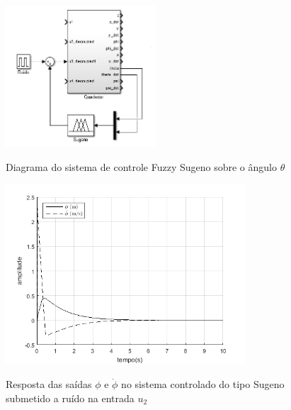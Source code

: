 \begin{figure}[!htb]
    \centering
    \caption{Diagrama do sistema de controle Fuzzy Sugeno sobre o ângulo $\theta$}
    \includegraphics[width=0.5\textwidth]{./04-figuras/resultados/fis_u3/u3_sugeno_blocks}
    \label{fig:u3_sugeno_blocks}
\end{figure}


\begin{figure}[!htb]
    \centering
    \caption{Resposta das saídas $\phi$ e $\dot{\phi}$ no sistema controlado do tipo Sugeno submetido a ruído na entrada $u_2$}
    \includegraphics[width=0.8\textwidth]{./04-figuras/resultados/fis_u2/u2_sugeno_u2_phi}
    \label{fig:u2_sugeno_u2_phi}
\end{figure}

